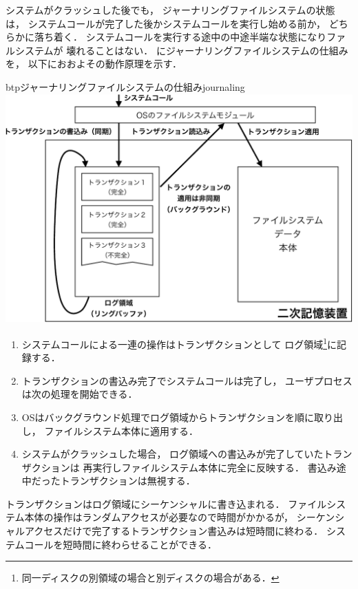 システムがクラッシュした後でも，
ジャーナリングファイルシステムの状態は，
システムコールが完了した後かシステムコールを実行し始める前か，
どちらかに落ち着く．
システムコールを実行する途中の中途半端な状態になりファルシステムが
壊れることはない．
にジャーナリングファイルシステムの仕組みを，
以下におおよその動作原理を示す．

\begin{myfig}{btp}{ジャーナリングファイルシステムの仕組み}{journaling}
  \includegraphics[scale=.75]{Fig/journaling-crop.pdf}
\end{myfig}

\begin{enumerate}
\item システムコールによる一連の操作はトランザクションとして
  ログ領域\footnote{同一ディスクの別領域の場合と別ディスクの場合がある．
  }に記録する．
\item トランザクションの書込み完了でシステムコールは完了し，
  ユーザプロセスは次の処理を開始できる．
\item OSはバックグラウンド処理でログ領域からトランザクションを順に取り出し，
  ファイルシステム本体に適用する．
\item システムがクラッシュした場合，
  ログ領域への書込みが完了していたトランザクションは
  再実行しファイルシステム本体に完全に反映する．
  書込み途中だったトランザクションは無視する．
\end{enumerate}

トランザクションはログ領域にシーケンシャルに書き込まれる．
ファイルシステム本体の操作はランダムアクセスが必要なので時間がかかるが，
シーケンシャルアクセスだけで完了するトランザクション書込みは短時間に終わる．
システムコールを短時間に終わらせることができる．

